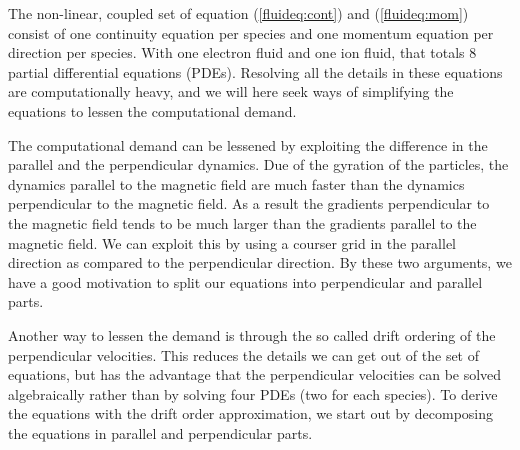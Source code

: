 The non-linear, coupled set of equation (\ref{fluideq:cont}) and (\ref{fluideq:mom}) consist of one continuity equation per species and one momentum equation per direction per species.
 With one electron fluid and one ion fluid, that totals $8$ partial differential equations (PDEs).
Resolving all the details in these equations are computationally heavy, and we will here seek ways of simplifying the equations to lessen the computational demand.

The computational demand can be lessened by exploiting the difference in the parallel and the perpendicular dynamics.
Due of the gyration of the particles, the dynamics parallel to the magnetic field are much faster than the dynamics perpendicular to the magnetic field.
As a result the gradients perpendicular to the magnetic field tends to be much larger than the gradients parallel to the magnetic field.
We can exploit this by using a courser grid in the parallel direction as compared to the perpendicular direction.
By these two arguments, we have a good motivation to split our equations into perpendicular and parallel parts.

Another way to lessen the demand is through the so called drift ordering of the perpendicular velocities.
 This reduces the details we can get out of the set of equations, but has the advantage that the perpendicular velocities can be solved algebraically rather than by solving four PDEs (two for each species).
 To derive the equations with the drift order approximation, we start out by decomposing the equations in parallel and perpendicular parts.

